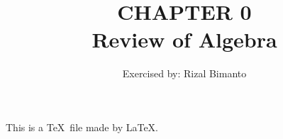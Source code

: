 \documentclass{article}
\title{CHAPTER 0\\Review of Algebra}
\author{Exercised by: Rizal Bimanto}
\date{}
\begin{document}
\maketitle
This is a \TeX\ file made by \LaTeX.
\end{document}
